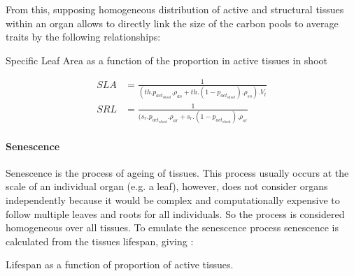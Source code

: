\indent From this, supposing homogeneous distribution of active and structural tissues within an organ allows to directly link the size of the carbon pools to average traits by the following relationships:
\begin{marginfigure}
\label{fig:SLA}
\caption{Specific Leaf Area as a function of the proportion in active tissues in shoot}
\end{marginfigure}

\begin{align}
  SLA &= \frac{1}{(th .  p_{act_{shoot}} . \rho_{as} + th . (1 -  p_{act_{shoot}}) . \rho_{ss} ) . V_{t}}\\
  SRL &= \frac{1}{(s_{r} .  p_{act_{shoot}} . \rho_{ar} + s_{r}.(1 -  p_{act_{shoot}}) . \rho_{sr}}
\end{align}


\paragraph{Senescence}

Senescence is the process of ageing of tissues. This process usually occurs at the scale of an individual organ (e.g. a leaf), however, \model does not consider organs independently because it would be complex and computationally expensive to follow multiple leaves and roots for all individuals. So the process is considered homogeneous over all tissues. To emulate the senescence process senescence is calculated from the tissues lifespan, giving :

\begin{marginfigure}[-8pt]
\label{fig:lifespan}
\caption{Lifespan as a function of proportion of active tissues.}
\end{marginfigure}

